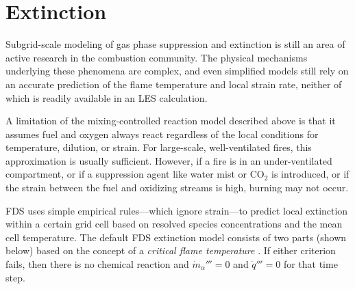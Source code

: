 \clearpage

\section{Extinction}
\label{extinction}

Subgrid-scale modeling of gas phase suppression and extinction is still an area of active research in the combustion community. The physical mechanisms underlying these phenomena are complex, and even simplified models still rely on an accurate prediction of the flame temperature and local strain rate, neither of which is readily available in an LES calculation.

A limitation of the mixing-controlled reaction model described above is that it assumes fuel and oxygen always react regardless of the local conditions for temperature, dilution, or strain. For large-scale, well-ventilated fires, this approximation is usually sufficient. However, if a fire is in an under-ventilated compartment, or if a suppression agent like water mist or CO$_2$ is introduced, or if the strain between the fuel and oxidizing streams is high, burning may not occur.

FDS uses simple empirical rules---which ignore strain---to predict local extinction within a certain grid cell based on resolved species concentrations and the mean cell temperature.  The default FDS extinction model consists of two parts (shown below) based on the concept of a \emph{critical flame temperature} \cite{SFPE:Beyler}. If either criterion fails, then there is no chemical reaction and $\dot{m}_\alpha'''=0$ and $\dot{q}'''=0$ for that time step.

